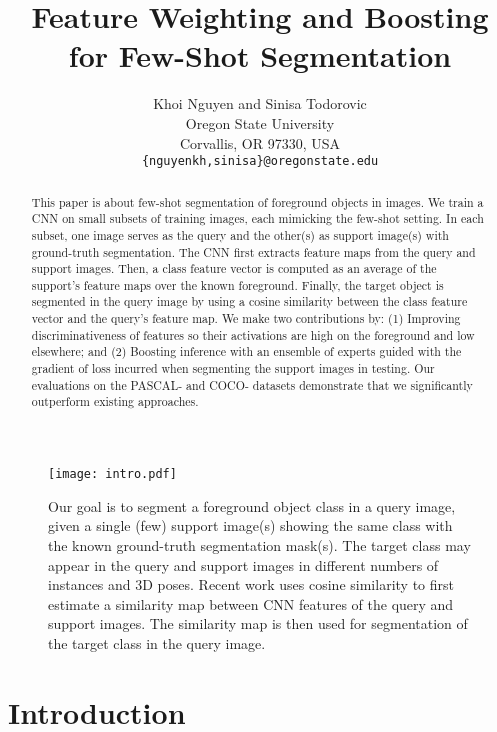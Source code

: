 \documentclass[10pt,twocolumn,letterpaper]{article}
\begin{document}
\title{Feature Weighting and Boosting for Few-Shot Segmentation}

\author{Khoi Nguyen and Sinisa Todorovic\\
Oregon State University\\
Corvallis, OR 97330, USA\\
{\tt\small {\{nguyenkh,sinisa\}}@oregonstate.edu}
}

\maketitle
\ificcvfinal\thispagestyle{empty}\fi

\begin{abstract}
This paper is about few-shot segmentation of foreground objects in images. We train a CNN on small subsets of training images, each mimicking the few-shot setting. In each subset, one image serves as the query and the other(s) as support image(s) with ground-truth segmentation. The CNN first extracts feature maps from the query and support images. Then, a class feature vector is computed as an average of the support's feature maps over the known foreground. Finally, the target object is segmented in the query image by using a cosine similarity between the class feature vector and the query's feature map.  We make two contributions by: (1) Improving discriminativeness of features so their activations are high on the foreground and low elsewhere; and (2) Boosting inference with an ensemble of experts guided with the gradient of loss incurred when segmenting the support images in testing.   Our evaluations on the PASCAL- and COCO- datasets demonstrate that we significantly outperform existing approaches.
\end{abstract}

\begin{figure}[t!]
    \centering
    \texttt{[image: intro.pdf]}
    \caption{Our goal is to segment a foreground object class in a query image, given a single (few) support image(s) showing the same class with the known ground-truth segmentation mask(s). The target class may appear in the query and support images in  different numbers of instances and 3D poses. Recent work uses cosine similarity to first estimate a similarity map between CNN features of the query and support images. The similarity map is then used for segmentation of the target class in the query image.}
    \label{fig:intro}
\end{figure}

\section{Introduction}
\end{document}
